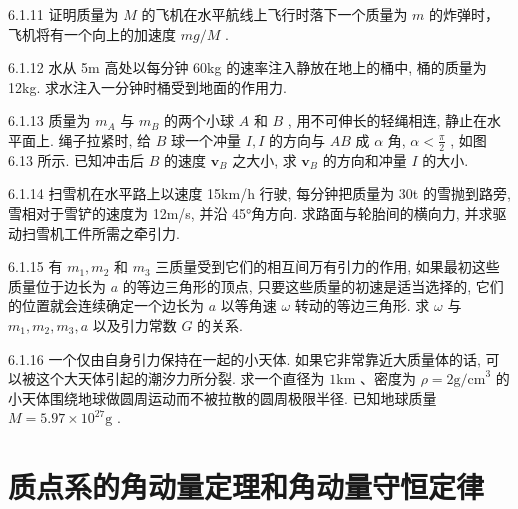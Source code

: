 \begin{problem}{6.1.11}
证明质量为 $M$ 的飞机在水平航线上飞行时落下一个质量为 $m$ 的炸弹时，飞机将有一个向上的加速度 $mg / M$ .
\end{problem}
\clearpage


\begin{problem}{6.1.12}
水从 5m 高处以每分钟 60kg 的速率注入静放在地上的桶中, 桶的质量为 12kg. 求水注入一分钟时桶受到地面的作用力.
\end{problem}
\clearpage


\begin{problem}{6.1.13}
质量为 $m_A$ 与 $m_B$ 的两个小球 $A$ 和 $B$ , 用不可伸长的轻绳相连, 静止在水平面上. 绳子拉紧时, 给 $B$ 球一个冲量 $I, I$ 的方向与 $AB$ 成 $\alpha$ 角, $\alpha < \frac{\pi}{2}$ , 如图 6.13 所示. 已知冲击后 $B$ 的速度 $\bm{v}_B$ 之大小, 求 $\bm{v}_B$ 的方向和冲量 $I$ 的大小.
\begin{center}

\end{center}
\end{problem}
\clearpage


\begin{problem}{6.1.14}
扫雪机在水平路上以速度 15km/h 行驶, 每分钟把质量为 30t 的雪抛到路旁, 雪相对于雪铲的速度为 12m/s, 并沿 45°角方向. 求路面与轮胎间的横向力, 并求驱动扫雪机工件所需之牵引力.
\end{problem}
\clearpage


\begin{problem}{6.1.15}
有 $m_{1}, m_{2}$ 和 $m_{3}$ 三质量受到它们的相互间万有引力的作用, 如果最初这些质量位于边长为 $a$ 的等边三角形的顶点, 只要这些质量的初速是适当选择的, 它们的位置就会连续确定一个边长为 $a$ 以等角速 $\omega$ 转动的等边三角形. 求 $\omega$ 与 $m_{1}, m_{2}, m_{3}, a$ 以及引力常数 $G$ 的关系.
\end{problem}
\clearpage


\begin{problem}{6.1.16}
一个仅由自身引力保持在一起的小天体. 如果它非常靠近大质量体的话, 可以被这个大天体引起的潮汐力所分裂. 求一个直径为 $1\mathrm{km}$ 、密度为 $\rho = 2\mathrm{g/cm}^3$ 的小天体围绕地球做圆周运动而不被拉散的圆周极限半径. 已知地球质量 $M = 5.97 \times 10^{27}\mathrm{g}$ .
\end{problem}
\clearpage


\section{质点系的角动量定理和角动量守恒定律}

